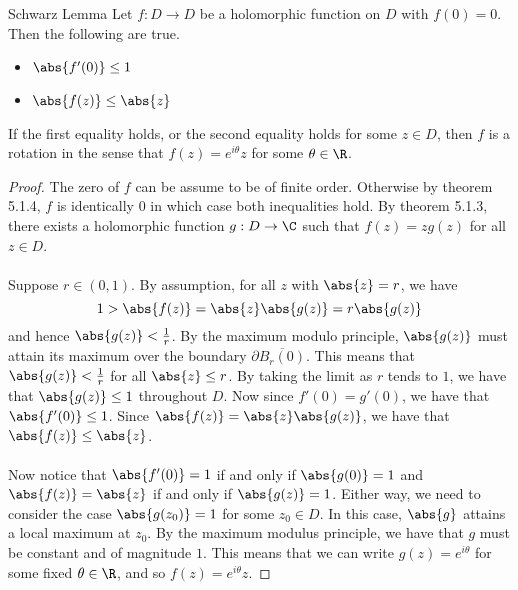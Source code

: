 \documentclass[a4paper]{article}
\begin{document}
\begin{thm}{Schwarz Lemma}{} Let $f:D\to D$ be a holomorphic function on $D$ with $f(0)=0$. Then the following are true. 
\begin{itemize}
\item $\abs{f'(0)}\leq 1$
\item $\abs{f(z)}\leq\abs{z}$
\end{itemize}
If the first equality holds, or the second equality holds for some $z\in D$, then $f$ is a rotation in the sense that $f(z)=e^{i\theta}z$ for some $\theta\in\R$. \tcbline
\begin{proof}
The zero of $f$ can be assume to be of finite order. Otherwise by theorem 5.1.4, $f$ is identically $0$ in which case both inequalities hold. By theorem 5.1.3, there exists a holomorphic function $g:D\to\C$ such that $f(z)=zg(z)$ for all $z\in D$. \\~\\

Suppose $r\in(0,1)$. By assumption, for all $z$ with $\abs{z}=r$, we have $$1>\abs{f(z)}=\abs{z}\abs{g(z)}=r\abs{g(z)}$$ and hence $\abs{g(z)}<\frac{1}{r}$. By the maximum modulo principle, $\abs{g(z)}$ must attain its maximum over the boundary $\partial\overline{B_r(0)}$. This means that $\abs{g(z)}<\frac{1}{r}$ for all $\abs{z}\leq r$. By taking the limit as $r$ tends to $1$, we have that $\abs{g(z)}\leq 1$ throughout $D$. Now since $f'(0)=g'(0)$, we have that $\abs{f'(0)}\leq 1$. Since $\abs{f(z)}=\abs{z}\abs{g(z)}$, we have that $\abs{f(z)}\leq\abs{z}$. \\~\\

Now notice that $\abs{f'(0)}=1$ if and only if $\abs{g(0)}=1$ and $\abs{f(z)}=\abs{z}$ if and only if $\abs{g(z)}=1$. Either way, we need to consider the case $\abs{g(z_0)}=1$ for some $z_0\in D$. In this case, $\abs{g}$ attains a local maximum at $z_0$. By the maximum modulus principle, we have that $g$ must be constant and of magnitude $1$. This means that we can write $g(z)=e^{i\theta}$ for some fixed $\theta\in\R$, and so $f(z)=e^{i\theta}z$. 
\end{proof}
\end{thm}
\end{document}
